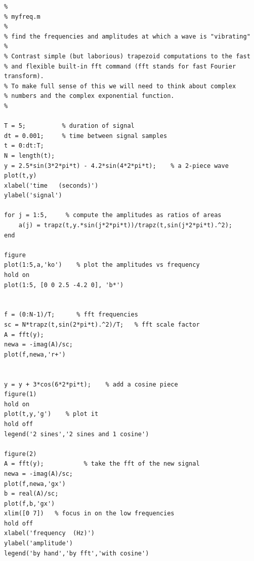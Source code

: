 \documentclass{article}
\begin{document}
\begin{verbatim}
%
% myfreq.m
%
% find the frequencies and amplitudes at which a wave is "vibrating"
%
% Contrast simple (but laborious) trapezoid computations to the fast
% and flexible built-in fft command (fft stands for fast Fourier transform).
% To make full sense of this we will need to think about complex
% numbers and the complex exponential function.
%

T = 5;			% duration of signal
dt = 0.001;     % time between signal samples
t = 0:dt:T;
N = length(t);
y = 2.5*sin(3*2*pi*t) - 4.2*sin(4*2*pi*t);    % a 2-piece wave
plot(t,y)
xlabel('time   (seconds)')
ylabel('signal')

for j = 1:5,     % compute the amplitudes as ratios of areas
    a(j) = trapz(t,y.*sin(j*2*pi*t))/trapz(t,sin(j*2*pi*t).^2);
end

figure
plot(1:5,a,'ko')    % plot the amplitudes vs frequency
hold on
plot(1:5, [0 0 2.5 -4.2 0], 'b*')


f = (0:N-1)/T;		% fft frequencies
sc = N*trapz(t,sin(2*pi*t).^2)/T;   % fft scale factor
A = fft(y);
newa = -imag(A)/sc;
plot(f,newa,'r+')


y = y + 3*cos(6*2*pi*t);    % add a cosine piece
figure(1)
hold on
plot(t,y,'g')    % plot it
hold off
legend('2 sines','2 sines and 1 cosine')

figure(2)
A = fft(y);           % take the fft of the new signal
newa = -imag(A)/sc;
plot(f,newa,'gx')
b = real(A)/sc;
plot(f,b,'gx')
xlim([0 7])   % focus in on the low frequencies
hold off
xlabel('frequency  (Hz)')
ylabel('amplitude')
legend('by hand','by fft','with cosine')
\end{verbatim}
\end{document}
